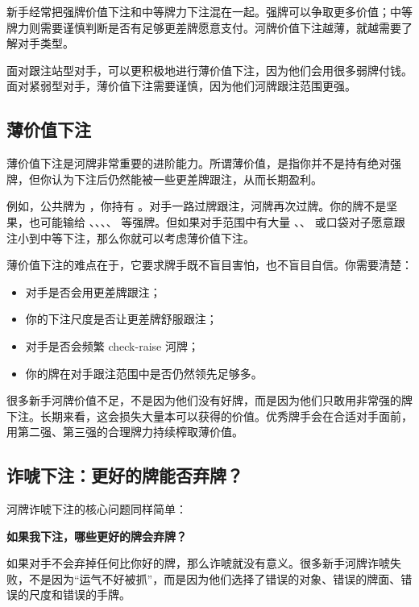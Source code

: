 新手经常把强牌价值下注和中等牌力下注混在一起。强牌可以争取更多价值；中等牌力则需要谨慎判断是否有足够更差牌愿意支付。河牌价值下注越薄，就越需要了解对手类型。

面对跟注站型对手，可以更积极地进行薄价值下注，因为他们会用很多弱牌付钱。面对紧弱型对手，薄价值下注需要谨慎，因为他们河牌跟注范围更强。

\subsection{薄价值下注}

薄价值下注是河牌非常重要的进阶能力。所谓薄价值，是指你并不是持有绝对强牌，但你认为下注后仍然能被一些更差牌跟注，从而长期盈利。

例如，公共牌为 ，你持有 。对手一路过牌跟注，河牌再次过牌。你的牌不是坚果，也可能输给 、、、、 等强牌。但如果对手范围中有大量 、、 或口袋对子愿意跟注小到中等下注，那么你就可以考虑薄价值下注。

薄价值下注的难点在于，它要求牌手既不盲目害怕，也不盲目自信。你需要清楚：

\begin{itemize}
\item 对手是否会用更差牌跟注；
\item 你的下注尺度是否让更差牌舒服跟注；
\item 对手是否会频繁 check-raise 河牌；
\item 你的牌在对手跟注范围中是否仍然领先足够多。
\end{itemize}

很多新手河牌价值不足，不是因为他们没有好牌，而是因为他们只敢用非常强的牌下注。长期来看，这会损失大量本可以获得的价值。优秀牌手会在合适对手面前，用第二强、第三强的合理牌力持续榨取薄价值。

\subsection{诈唬下注：更好的牌能否弃牌？}

河牌诈唬下注的核心问题同样简单：

\begin{center}
\textbf{如果我下注，哪些更好的牌会弃牌？}
\end{center}

如果对手不会弃掉任何比你好的牌，那么诈唬就没有意义。很多新手河牌诈唬失败，不是因为“运气不好被抓”，而是因为他们选择了错误的对象、错误的牌面、错误的尺度和错误的手牌。

